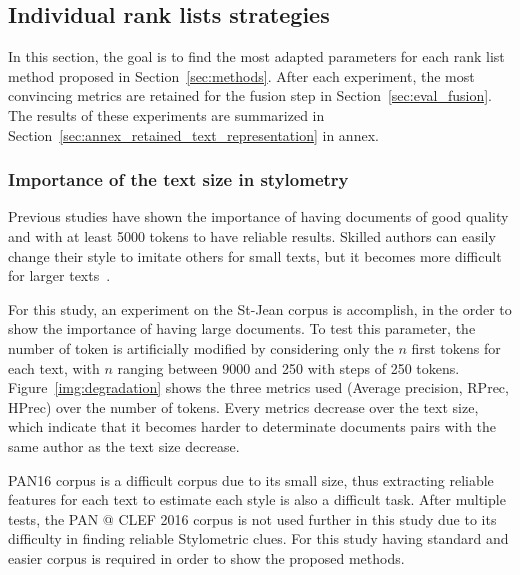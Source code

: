 \subsection{Individual rank lists strategies \label{sec:eval_rl}}

In this section, the goal is to find the most adapted parameters for each rank list method proposed in Section~\ref{sec:methods}.
After each experiment, the most convincing metrics are retained for the fusion step in Section~\ref{sec:eval_fusion}.
The results of these experiments are summarized in Section~\ref{sec:annex_retained_text_representation} in annex.

\subsubsection{Importance of the text size in stylometry}

Previous studies have shown the importance of having documents of good quality and with at least 5000 tokens to have reliable results.
Skilled authors can easily change their style to imitate others for small texts, but it becomes more difficult for larger texts~\cite{savoy_stylo}.

For this study, an experiment on the St-Jean corpus is accomplish, in the order to show the importance of having large documents.
To test this parameter, the number of token is artificially modified by considering only the $n$ first tokens for each text, with $n$ ranging between 9000 and 250 with steps of 250 tokens.
Figure~\ref{img:degradation} shows the three metrics used (Average precision, RPrec, HPrec) over the number of tokens.
Every metrics decrease over the text size, which indicate that it becomes harder to determinate documents pairs with the same author as the text size decrease.

PAN16 corpus is a difficult corpus due to its small size, thus extracting reliable features for each text to estimate each style is also a difficult task.
After multiple tests, the PAN @ CLEF 2016 corpus is not used further in this study due to its difficulty in finding reliable Stylometric clues.
For this study having standard and easier corpus is required in order to show the proposed methods.


